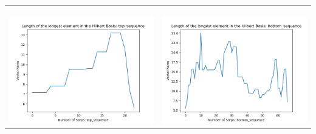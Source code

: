 \documentclass[10pt]{article}
\begin{document}
\begin{tabular}{c|c}
\begin{minipage}{.45\textwidth}
\end{minipage} \\ \\
\hline \\\begin{minipage}{.45\textwidth}
\includegraphics[width=\textwidth]{"DATA/5d/5 generators 2 bound D/top_sequence LENGTH"}
\end{minipage} &
\begin{minipage}{.45\textwidth}
\includegraphics[width=\textwidth]{"DATA/5d/5 generators 2 bound D bottomup/bottom_sequence LENGTH"}
\end{minipage}
\end{tabular}
\end{document}
